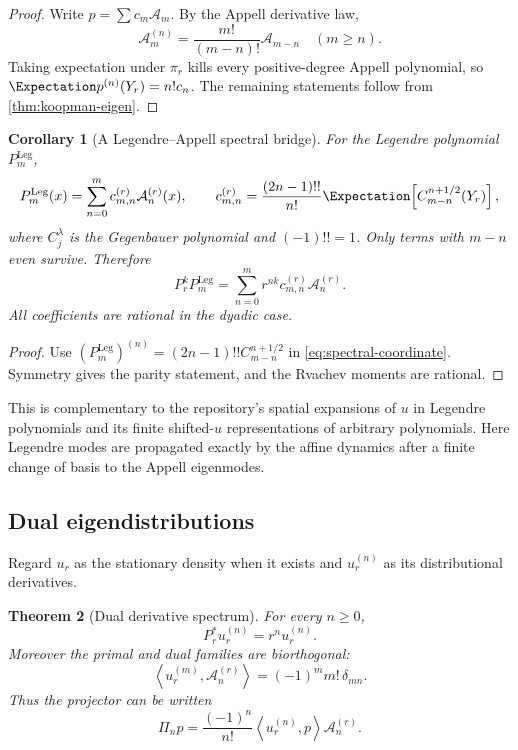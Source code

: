 \documentclass[11pt,a4paper]{article}
\newtheorem{theorem}{Theorem}[section]
\newtheorem{corollary}[theorem]{Corollary}
\theoremstyle{definition}
\theoremstyle{remark}
\newcommand{\Acal}{\mathcal A}
\newcommand{\PiD}{\Pi}
\begin{document}
\begin{proof}
Write $p=\sum c_m\Acal_m$. By the Appell derivative law,
\[
 \Acal_m^{(n)}=\frac{m!}{(m-n)!}\Acal_{m-n}
 \quad(m\ge n).
\]
Taking expectation under $\pi_r$ kills every positive-degree Appell polynomial, so $\Expectation p^{(n)}(Y_r)=n!c_n$. The remaining statements follow from \cref{thm:koopman-eigen}.
\end{proof}

\begin{corollary}[A Legendre--Appell spectral bridge]
\label{cor:legendre-appell}
For the Legendre polynomial $P_m^{\mathrm{Leg}}$,
\begin{equation}
 P_m^{\mathrm{Leg}}(x)
 =\sum_{n=0}^{m}c_{m,n}^{(r)}\Acal_n^{(r)}(x),
 \qquad
 c_{m,n}^{(r)}=\frac{(2n-1)!!}{n!}
 \Expectation\!\left[C_{m-n}^{n+1/2}(Y_r)\right],
 \label{eq:legendre-appell}
\end{equation}
where $C_j^\lambda$ is the Gegenbauer polynomial and $(-1)!!=1$. Only terms with $m-n$ even survive. Therefore
\begin{equation}
 P_r^kP_m^{\mathrm{Leg}}
 =\sum_{n=0}^{m}r^{nk}c_{m,n}^{(r)}\Acal_n^{(r)}.
 \label{eq:legendre-iterate}
\end{equation}
All coefficients are rational in the dyadic case.
\end{corollary}

\begin{proof}
Use $(P_m^{\mathrm{Leg}})^{(n)}=(2n-1)!!C_{m-n}^{n+1/2}$ in \eqref{eq:spectral-coordinate}. Symmetry gives the parity statement, and the Rvachev moments are rational.
\end{proof}

This is complementary to the repository's spatial expansions of $u$ in Legendre polynomials and its finite shifted-$u$ representations of arbitrary polynomials. Here Legendre modes are propagated exactly by the affine dynamics after a finite change of basis to the Appell eigenmodes.

\subsection{Dual eigendistributions}

Regard $u_r$ as the stationary density when it exists and $u_r^{(n)}$ as its distributional derivatives.

\begin{theorem}[Dual derivative spectrum]
\label{thm:dual-spectrum}
For every $n\ge0$,
\begin{equation}
 P_r^*u_r^{(n)}=r^nu_r^{(n)}.
 \label{eq:dual-eigen}
\end{equation}
Moreover the primal and dual families are biorthogonal:
\begin{equation}
 \left\langle u_r^{(m)},\Acal_n^{(r)}\right\rangle
 =(-1)^m m!\,\delta_{mn}.
 \label{eq:biorthogonal}
\end{equation}
Thus the projector can be written
\begin{equation}
 \PiD_np=\frac{(-1)^n}{n!}
 \left\langle u_r^{(n)},p\right\rangle\Acal_n^{(r)}.
 \label{eq:projector-dual}
\end{equation}
\end{theorem}
\end{document}
